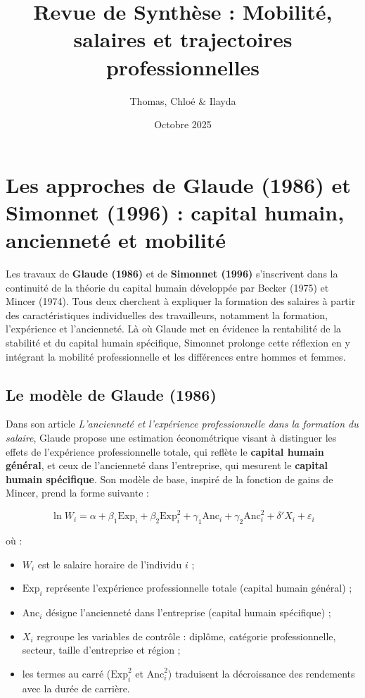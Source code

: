 \documentclass[12pt,a4paper]{article}
\title{Revue de Synthèse : Mobilité, salaires et trajectoires professionnelles}
\author{Thomas, Chloé \& Ilayda}
\date{Octobre 2025}
\begin{document}
\maketitle


\section{Les approches de Glaude (1986) et Simonnet (1996) : capital humain, ancienneté et mobilité}

Les travaux de \textbf{Glaude (1986)} et de \textbf{Simonnet (1996)} s’inscrivent dans la continuité de la théorie du capital humain développée par Becker (1975) et Mincer (1974).  
Tous deux cherchent à expliquer la formation des salaires à partir des caractéristiques individuelles des travailleurs, notamment la formation, l’expérience et l’ancienneté.  
Là où Glaude met en évidence la rentabilité de la stabilité et du capital humain spécifique, Simonnet prolonge cette réflexion en y intégrant la mobilité professionnelle et les différences entre hommes et femmes.

\subsection{Le modèle de Glaude (1986)}

Dans son article \textit{L’ancienneté et l’expérience professionnelle dans la formation du salaire}, Glaude propose une estimation économétrique visant à distinguer les effets de l’expérience professionnelle totale, qui reflète le \textbf{capital humain général}, et ceux de l’ancienneté dans l’entreprise, qui mesurent le \textbf{capital humain spécifique}.  
Son modèle de base, inspiré de la fonction de gains de Mincer, prend la forme suivante :

\begin{equation}
\ln W_i = \alpha + \beta_1 \text{Exp}_i + \beta_2 \text{Exp}_i^2 + \gamma_1 \text{Anc}_i + \gamma_2 \text{Anc}_i^2 + \delta' X_i + \varepsilon_i
\end{equation}

où :
\begin{itemize}
    \item $W_i$ est le salaire horaire de l’individu $i$ ;
    \item $\text{Exp}_i$ représente l’expérience professionnelle totale (capital humain général) ;
    \item $\text{Anc}_i$ désigne l’ancienneté dans l’entreprise (capital humain spécifique) ;
    \item $X_i$ regroupe les variables de contrôle : diplôme, catégorie professionnelle, secteur, taille d’entreprise et région ;
    \item les termes au carré ($\text{Exp}_i^2$ et $\text{Anc}_i^2$) traduisent la décroissance des rendements avec la durée de carrière.
\end{itemize}
\end{document}
